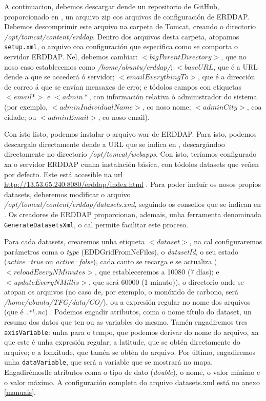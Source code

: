 A continuacion, debemos descargar dende un repositorio de GitHub, proporcionado en \cite{erddapsetup}, un arquivo zip cos arquivos de configuración de ERDDAP. Debemos descomprimir este arquivo na 
carpeta de Tomcat, creando o directorio \textit{/opt/tomcat/content/erddap}. Dentro dos arquivos desta carpeta, atopamos \texttt{setup.xml}, o arquivo coa configuración que especifica como se
comporta o servidor ERDDAP. Nel, debemos cambiar: $<bigParentDirectory>$, que no noso caso establecemos como \textit{/home/ubuntu/erddap/}; $<baseURL$, que é a URL dende a que se accederá ó servidor;
$<emailEverythingTo>$, que é a dirección de correo á que se envían mensaxes de erro; e tódolos campos con etiquetas $<email*>$ e $<admin*$, con información relativa ó administrador do sistema (por
exemplo, $<adminIndividualName>$, co noso nome; $<adminCity>$, coa cidade; ou $<adminEmail>$, co noso email).

Con isto listo, podemos instalar o arquivo war de ERDDAP. Para isto, podemos descargalo directamente dende a URL que se indica en \cite{erddapsetup}, descargándoo directamente no directorio \textit{/opt/tomcat/webapps}.
Con isto, teríamos configurado xa o servidor ERDDAP cunha instalación básica, con tódolos datasets que veñen por defecto. Este está accesible na url \url{http://13.53.65.240:8080/erddap/index.html} .
Para poder incluír os nosos propios datasets, deberemos modificar o arquivo \textit{/opt/tomcat/content/erddap/datasets.xml}, seguindo os consellos que se indican en \cite{erddapdatasets}. Os
creadores de ERDDAP proporcionan, ademais, unha ferramenta denominada \texttt{GenerateDatasetsXml}, o cal permite facilitar este proceso.

Para cada datasets, crearemos unha etiqueta $<dataset>$, na cal configuraremos parámetros coma o \textit{type} (EDDGridFromNcFiles), o \textit{datasetId}, o seu estado (\textit{active=true} ou \textit{active=false}),
cada canto se recarga e se actualiza ($<reloadEveryNMinutes>$, que estableceremos a 10080 (7 días); e \break$<updateEveryNMillis>$, que será 60000 (1 minuto)), o directorio onde se atopan os
arquivos (no caso de, por exemplo, o monóxido de carbono, será \textit{/home/ubuntu/TFG/data/CO/}), ou a expresión regular no nome dos arquivos (que é \textit{.*\textbackslash.nc}) . Podemos
engadir atributos, coma o nome título do dataset, un resumo dos datos que ten ou as variables do mesmo. Tamén engadiremos tres \texttt{axisVariable}: unha para o tempo, que podemos derivar do nome
do arquivo, xa que este é unha expresión regular; a latitude, que se obtén directamente do arquivo; e a lonxitude, que tamén se obtén do arquivo. Por último, engadiremos unha \texttt{dataVariable}, que
será a variable que se mostrará no mapa. Engadirémoslle atributos coma o tipo de dato (\textit{double}), o nome, o valor mínimo e o valor máximo. A configuración completa do arquivo datasets.xml
está no anexo \ref{manuais}.


